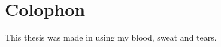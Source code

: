 \documentclass[\relativeRoot/main.tex]{subfiles}
\begin{document}
    
\chapter*{Colophon}
This thesis was made in \LaTeXe{} using my blood, sweat and tears.

\printbibliography[title={Bibliography}]
\listoffigures
\listoftables
\printglossary[title={Abbreviations},type=acronym,style=long]
\end{document}
